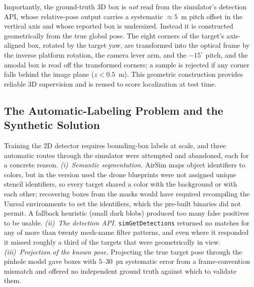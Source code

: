 Importantly, the ground-truth 3D box is \emph{not} read from the simulator's
detection API, whose relative-pose output carries a systematic $\approx 5$~m pitch
offset in the vertical axis and whose reported box is undersized. Instead it is
constructed geometrically from the true global pose. The eight corners of the
target's axis-aligned box, rotated by the target yaw, are transformed into the
optical frame by the inverse platform rotation, the camera lever arm, and the
$-15^\circ$ pitch, and the amodal box is read off the transformed corners; a
sample is rejected if any corner falls behind the image plane ($z<0.5$~m). This
geometric construction provides reliable 3D supervision and is reused to score
localization at test time.

\subsection{The Automatic-Labeling Problem and the Synthetic Solution}
\label{sec:labeling}

Training the 2D detector requires bounding-box labels at scale, and three
automatic routes through the simulator were attempted and abandoned, each for a
concrete reason. \emph{(i)~Semantic segmentation.} AirSim maps object identifiers
to colors, but in the version used the drone blueprints were not assigned unique
stencil identifiers, so every target shared a color with the background or with
each other; recovering boxes from the masks would have required recompiling the
Unreal environments to set the identifiers, which the pre-built binaries did not
permit. A fallback heuristic (small dark blobs) produced too many false positives
to be usable. \emph{(ii)~The detection API.} \texttt{simGetDetections} returned no
matches for any of more than twenty mesh-name filter patterns, and even where it
responded it missed roughly a third of the targets that were geometrically in
view. \emph{(iii)~Projection of the known pose.} Projecting the true target pose
through the pinhole model gave boxes with $5$--$30$~px systematic error from a
frame-convention mismatch and offered no independent ground truth against which to
validate them.

